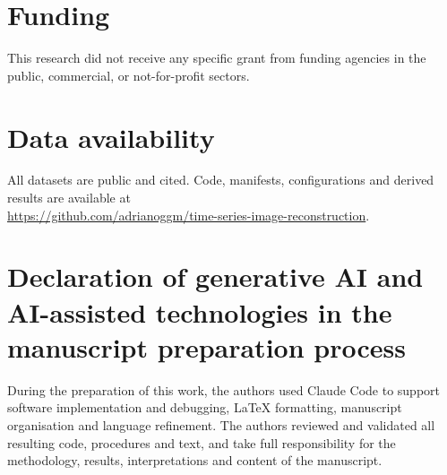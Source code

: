 \documentclass[preprint,review,12pt]{elsarticle}
\begin{document}
\section*{Funding}
This research did not receive any specific grant from funding agencies in the public, commercial, or not-for-profit sectors.

\section*{Data availability}
All datasets are public and cited. Code, manifests, configurations and derived results are available at\\
\url{https://github.com/adrianoggm/time-series-image-reconstruction}.

\section*{Declaration of generative AI and AI-assisted technologies in the manuscript preparation process}
During the preparation of this work, the authors used Claude Code to support software implementation and debugging, LaTeX formatting, manuscript organisation and language refinement. The authors reviewed and validated all resulting code, procedures and text, and take full responsibility for the methodology, results, interpretations and content of the manuscript.
\end{document}
